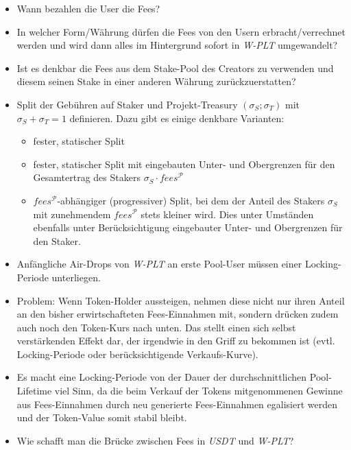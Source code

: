 \begin{itemize}
	\item Wann bezahlen die User die Fees?
	\item In welcher Form/Währung dürfen die Fees von den Usern erbracht/verrechnet werden und wird dann alles im Hintergrund sofort in \textit{W-PLT} umgewandelt?
	\item Ist es denkbar die Fees aus dem Stake-Pool des Creators zu verwenden und diesem seinen Stake in einer anderen Währung zurückzuerstatten?
	\item Split der Gebühren auf Staker und Projekt-Treasury $(\sigma_{S}; \sigma_{T})$ mit $\sigma_{S} + \sigma_{T} = 1$ definieren. Dazu gibt es einige denkbare Varianten:
	\begin{itemize}
		\item fester, statischer Split
		\item fester, statischer Split mit eingebauten Unter- und Obergrenzen für den Gesamtertrag des Stakers $\sigma_{S} \cdot fees^{\mathcal{P}}$
		\item $fees^{\mathcal{P}}$-abhängiger (progressiver) Split, bei dem der Anteil des Stakers $\sigma_{S}$ mit zunehmendem $fees^{\mathcal{P}}$ stets kleiner wird. Dies unter Umständen ebenfalls unter Berücksichtigung eingebauter Unter- und Obergrenzen für den Staker.
	\end{itemize}	
	\item Anfängliche Air-Drops von \textit{W-PLT} an erste Pool-User müssen einer Locking-Periode unterliegen.
	\item Problem: Wenn Token-Holder aussteigen, nehmen diese nicht nur ihren Anteil an den bisher erwirtschafteten Fees-Einnahmen mit, sondern drücken zudem auch noch den Token-Kurs nach unten. Das stellt einen sich selbst verstärkenden Effekt dar, der irgendwie in den Griff zu bekommen ist (evtl. Locking-Periode oder berücksichtigende Verkaufs-Kurve).
	\item Es macht eine Locking-Periode von der Dauer der durchschnittlichen Pool-Lifetime viel Sinn, da die beim Verkauf der Tokens mitgenommenen Gewinne aus Fees-Einnahmen durch neu generierte Fees-Einnahmen egalisiert werden und der Token-Value somit stabil bleibt.
	\item Wie schafft man die Brücke zwischen Fees in \textit{USDT} und \textit{W-PLT}?
\end{itemize}


\newpage

